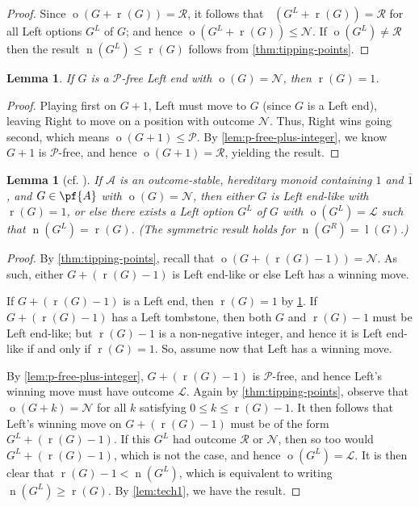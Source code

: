 \documentclass[11pt]{article}
\newtheorem{lemma}[theorem]{Lemma}
\theoremstyle{definition}
\DeclareMathOperator{\outcome}{o}
\DeclareMathOperator{\outcomeR}{o_R}
\newcommand{\set}[1]{\mathcal{#1}}
\DeclareMathOperator{\ltp}{l}
\DeclareMathOperator{\ntp}{n}
\DeclareMathOperator{\rtp}{r}
\begin{document}
\begin{proof}
    Since $\outcome(G+\rtp(G))=\mathscr{R}$, it follows that
    $\outcomeR(G^L+\rtp(G))=\mathscr{R}$ for all Left options $G^L$ of $G$; and
    hence $\outcome(G^L+\rtp(G))\leq\mathscr{N}$. If
    $\outcome(G^L)\neq\mathscr{R}$ then the result $\ntp(G^L)\leq\rtp(G)$
    follows from \cref{thm:tipping-points}.
\end{proof}

\begin{lemma}
    \label{lem:left-end-n-r1}
    If $G$ is a $\mathscr{P}$-free Left end with $\outcome(G)=\mathscr{N}$,
    then $\rtp(G)=1$.
\end{lemma}

\begin{proof}
    Playing first on $G+1$, Left must move to $G$ (since $G$ is a Left end),
    leaving Right to move on a position with outcome $\mathscr{N}$. Thus, Right
    wins going second, which means $\outcome(G+1)\leq\mathscr{P}$. By
    \cref{lem:p-free-plus-integer}, we know $G+1$ is $\mathscr{P}$-free, and
    hence $\outcome(G+1)=\mathscr{R}$, yielding the result.
\end{proof}

\begin{lemma}[cf. {\cite[Lemma 7 on p.~6]{milley.renault:invertible}}]
    \label{lem:tech2}
    If $\set{A}$ is an outcome-stable, hereditary monoid containing $1$ and
    $\overline{1}$, and $G\in\pf{A}$ with $\outcome(G)=\mathscr{N}$, then
    either $G$ is Left end-like with $\rtp(G)=1$, or else there exists a Left
    option $G^L$ of $G$ with $\outcome(G^L)=\mathscr{L}$ such that
    $\ntp(G^L)=\rtp(G)$. (The symmetric result holds for $\ntp(G^R)=\ltp(G)$.)
\end{lemma}

\begin{proof}
    By \cref{thm:tipping-points}, recall that
    $\outcome(G+(\rtp(G)-1))=\mathscr{N}$. As such, either $G+(\rtp(G)-1)$ is
    Left end-like or else Left has a winning move.

    If $G+(\rtp(G)-1)$ is a Left end, then $\rtp(G)=1$ by
    \cref{lem:left-end-n-r1}. If $G+(\rtp(G)-1)$ has a Left tombstone, then
    both $G$ and $\rtp(G)-1$ must be Left end-like; but $\rtp(G)-1$ is a
    non-negative integer, and hence it is Left end-like if and only if
    $\rtp(G)=1$. So, assume now that Left has a winning move.

    By \cref{lem:p-free-plus-integer}, $G+(\rtp(G)-1)$ is $\mathscr{P}$-free,
    and hence Left's winning move must have outcome $\mathscr{L}$. Again by
    \cref{thm:tipping-points}, observe that $\outcome(G+k)=\mathscr{N}$ for all
    $k$ satisfying $0\leq k\leq\rtp(G)-1$. It then follows that Left's winning
    move on $G+(\rtp(G)-1)$ must be of the form $G^L+(\rtp(G)-1)$. If this
    $G^L$ had outcome $\mathscr{R}$ or $\mathscr{N}$, then so too would
    $G^L+(\rtp(G)-1)$, which is not the case, and hence
    $\outcome(G^L)=\mathscr{L}$. It is then clear that $\rtp(G)-1<\ntp(G^L)$,
    which is equivalent to writing $\ntp(G^L)\geq\rtp(G)$. By \cref{lem:tech1},
    we have the result.
\end{proof}
\end{document}
